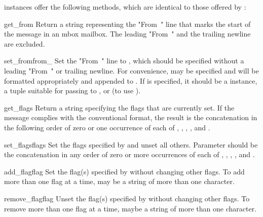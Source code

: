  instances offer the following methods, which are identical
to those offered by :

\begin{methoddesc}{get_from}{}
Return a string representing the "From~" line that marks the start of the
message in an mbox mailbox. The leading "From~" and the trailing newline are
excluded.
\end{methoddesc}

\begin{methoddesc}{set_from}{from_}
Set the "From~" line to , which should be specified without a
leading "From~" or trailing newline. For convenience,  may be
specified and will be formatted appropriately and appended to . If
 is specified, it should be a  instance, a tuple
suitable for passing to , or  (to use
).
\end{methoddesc}

\begin{methoddesc}{get_flags}{}
Return a string specifying the flags that are currently set. If the message
complies with the conventional format, the result is the concatenation in the
following order of zero or one occurrence of each of ,
, , , and .
\end{methoddesc}

\begin{methoddesc}{set_flags}{flags}
Set the flags specified by  and unset all others. Parameter
 should be the concatenation in any order of zero or more
occurrences of each of , , ,
, and .
\end{methoddesc}

\begin{methoddesc}{add_flag}{flag}
Set the flag(s) specified by  without changing other flags. To add
more than one flag at a time,  may be a string of more than one
character.
\end{methoddesc}

\begin{methoddesc}{remove_flag}{flag}
Unset the flag(s) specified by  without changing other flags. To
remove more than one flag at a time,  maybe a string of more than one
character.
\end{methoddesc}

